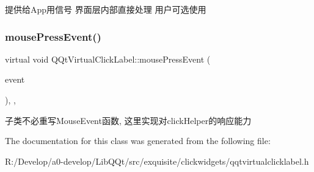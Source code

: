 提供给\+App用信号 界面层内部直接处理 用户可选使用 \mbox{\label{class_q_qt_virtual_click_label_a86608b546a91196c9d31c46ccd50f3a1}} 
\subsubsection{\texorpdfstring{mouse\+Press\+Event()}{mousePressEvent()}}
{\footnotesize\ttfamily virtual void Q\+Qt\+Virtual\+Click\+Label\+::mouse\+Press\+Event (\begin{DoxyParamCaption}\item[{Q\+Mouse\+Event $\ast$}]{event }\end{DoxyParamCaption})\hspace{0.3cm}{\ttfamily [inline]}, {\ttfamily [protected]}, {\ttfamily [virtual]}}

子类不必重写\+Mouse\+Event函数, 这里实现对click\+Helper的响应能力 

The documentation for this class was generated from the following file\+:\begin{DoxyCompactItemize}
\item 
R\+:/\+Develop/a0-\/develop/\+Lib\+Q\+Qt/src/exquisite/clickwidgets/qqtvirtualclicklabel.\+h\end{DoxyCompactItemize}
